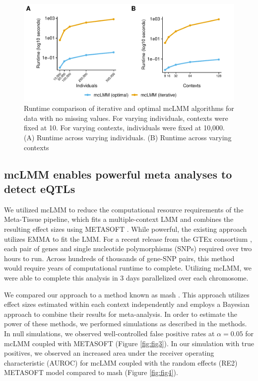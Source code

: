         \begin{figure}
            \centering
            \includegraphics[width=\textwidth]{chapter3/figures/Figure_2.pdf}
            \caption{Runtime comparison of iterative and optimal mcLMM algorithms for data with no missing values. For varying individuals, contexts were fixed at 10. For varying contexts, individuals were fixed at 10,000. (A) Runtime across varying individuals. (B) Runtime across varying contexts}
            \label{fig:fig2}
        \end{figure}
    
    \subsection{mcLMM enables powerful meta analyses to detect eQTLs}
        We utilized mcLMM to reduce the computational resource requirements of the Meta-Tissue pipeline, which fits a multiple-context LMM and combines the resulting effect sizes using METASOFT \cite{Sul}. While powerful, the existing approach utilizes EMMA to fit the LMM. For a recent release from the GTEx consortium  \cite{GTEx_Consortium2020-xx}, each pair of genes and single nucleotide polymorphisms (SNPs) required over two hours to run. Across hundreds of thousands of gene-SNP pairs, this method would require years of computational runtime to complete. Utilizing mcLMM, we were able to complete this analysis in 3 days parallelized over each chromosome. 
        
        We compared our approach to a method known as mash \cite{Urbut2019}. This approach utilizes effect sizes estimated within each context independently and employs a Bayesian approach to combine their results for meta-analysis. In order to estimate the power of these methods, we performed simulations as described in the methods. In null simulations, we observed well-controlled false positive rates at $\alpha = 0.05$ for mcLMM coupled with METASOFT (Figure \ref{fig:fig3}). In our simulation with true positives, we observed an increased area under the receiver operating characteristic (AUROC) for mcLMM coupled with the random effects (RE2) METASOFT model compared to mash (Figure \ref{fig:fig4}).
        
